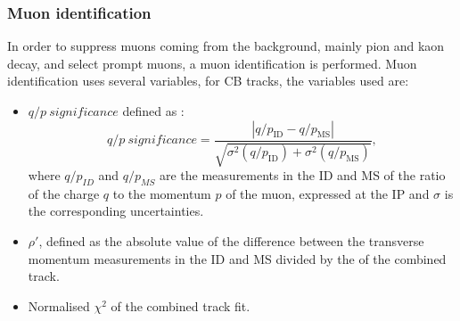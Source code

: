 \subsubsection{Muon identification}
\label{chap2:Objects:Muon:ID}
In order to suppress muons coming from the background, mainly pion and kaon decay, and select prompt muons, a muon identification is performed. Muon identification uses several variables, for CB tracks, the variables used are:
\begin{itemize}
    \item $q/p \ significance$ defined as : 
    \begin{equation}
        q / p \ significance=\frac{\left|q / p_{\mathrm{ID}}-q / p_{\mathrm{MS}}\right|}{\sqrt{\sigma^{2}\left(q / p_{\mathrm{ID}}\right)+\sigma^{2}\left(q / p_{\mathrm{MS}}\right)}},
    \end{equation}
    where $q/p_{ID}$ and $q/p_{MS}$ are the measurements in the ID and MS of the ratio of the charge $q$ to the momentum $p$ of the muon, expressed at the IP and $\sigma$ is the corresponding uncertainties. 
    \item $\rho'$, defined as the absolute value of the difference between the transverse momentum measurements in the ID and MS divided by the \pT of the combined track.
    \item Normalised $\chi^2$ of the combined track fit. 
\end{itemize}

